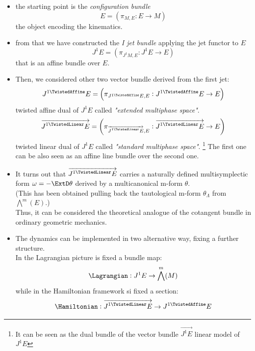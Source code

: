\documentclass[a4paper,12pt]{scrartcl}  %
\renewcommand{\AffDualJet}{ J^{1 \TwistedAffine}E }
\renewcommand{\LinDualJet}{ \overrightarrow{J^{1 \TwistedLinear}E} }
\begin{document}
\begin{itemize}
 \item the starting point is the \emph{configuration bundle} 
 	\begin{displaymath}
 		E = \left( \pi_{M,E} : E\rightarrow M \right)
 	\end{displaymath}
 	the object encoding the kinematics.
 \item from that we have constructed the \emph{I jet bundle} applying the jet functor to $E$ 
 	\begin{displaymath}
 	J^1E = \left( \pi_{J^1 M,E} : J^1 E\rightarrow E \right)
 	\end{displaymath} 
 	that is an affine bundle over $E$.
 \item Then, we considered other two vector bundle derived from the first jet:
 	\begin{displaymath}
 	\AffDualJet  = \left( \pi_{ \AffDualJet ,E} : \AffDualJet  \rightarrow E \right)
 	\end{displaymath}
	twisted affine dual of $J^1E$ called \emph{"extended multiphase space"}.
	\begin{displaymath}
		\LinDualJet  = \left( \pi_{ \LinDualJet ,E} : \LinDualJet \rightarrow E \right)
	\end{displaymath}
	twisted linear dual of $J^1 E$ called \emph{"standard multiphase space"}. \footnote{It can be seen as the dual bundle of the vector bundle $\vec{J^1E}$ linear model of $J^1E$}
	The first one can be also seen as an affine line bundle over the second one.
	
\item It turns out that  $\LinDualJet $ carries a naturally defined multisymplectic form $\omega = -\ExtD \theta$ derived by a multicanonical m-form $\theta$. \\
	(This has been obtained pulling back the tautological m-form $\theta_\Lambda$ from $\bigwedge^m (E)$.) \\
	Thus, it can be considered the theoretical analogue of the cotangent bundle in ordinary geometric mechanics.
	
\item The dynamics can be implemented in two alternative way, fixing a further structure.\\
	In the Lagrangian picture is fixed a bundle map:
	\begin{displaymath}
		\Lagrangian : J^1 E \rightarrow \bigwedge^m (M)
	\end{displaymath}
	while in the Hamiltonian framework si fixed a section:
	\begin{displaymath}
		\Hamiltonian : \LinDualJet \rightarrow \AffDualJet
	\end{displaymath}


\end{itemize}
\end{document}
